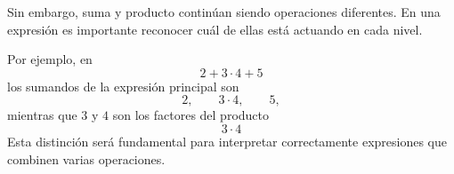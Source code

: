 Sin embargo, suma y producto continúan siendo operaciones diferentes. En una expresión es importante reconocer cuál de ellas está actuando en cada nivel.

Por ejemplo, en
\[
2+3\cdot4+5
\]
los sumandos de la expresión principal son
\[
2,\qquad3\cdot4,\qquad5,
\]
mientras que \(3\) y \(4\) son los factores del producto
\[
3\cdot4
\]
Esta distinción será fundamental para interpretar correctamente expresiones que combinen varias operaciones.
